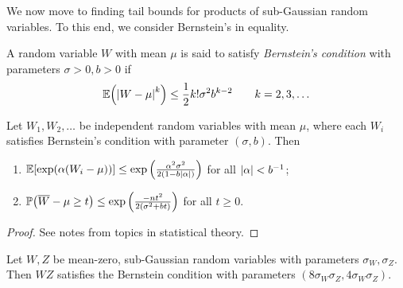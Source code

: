 We now move to finding tail bounds for products of sub-Gaussian random variables. To this end, we consider Bernstein's in equality. 
\begin{definition}
	A random variable $W$ with mean $\mu$ is said to satisfy \emph{Bernstein's condition} with parameters $\sigma > 0, b > 0$ if 
	\[
	\mathbb E\qty(\abs{W - \mu}^k) \leq \frac12 k! \sigma^2 b^{k-2} \qquad k = 2, 3, \dotsc
	\]
\end{definition}

\begin{proposition}
	Let $W_1, W_2, \dotsc$ be independent random variables with mean $\mu$, where each $W_i$ satisfies Bernstein's condition with parameter $(\sigma, b)$. Then 
	\begin{enumerate}
		\item $\mathbb E[\exp(\alpha(W_i - \mu))] \leq \exp\qty(\frac{\alpha^2\sigma^2}{2(1 - b \abs{\alpha})})$ for all $\abs{\alpha} < b^{-1}$;
		\item $\mathbb P\qty(\overline{W} - \mu \geq t) \leq \exp\qty(\frac{-nt^2}{2(\sigma^2 + bt)})$ for all $t \geq 0$.  
	\end{enumerate}
\end{proposition}

\begin{proof}
	See notes from topics in statistical theory.
\end{proof}

\begin{lemma}
	Let $W, Z$ be mean-zero, sub-Gaussian random variables with parameters $\sigma_W, \sigma_Z$. Then $WZ$ satisfies the Bernstein condition with parameters $(8\sigma_W\sigma_Z, 4\sigma_W\sigma_Z)$. 
\end{lemma}

